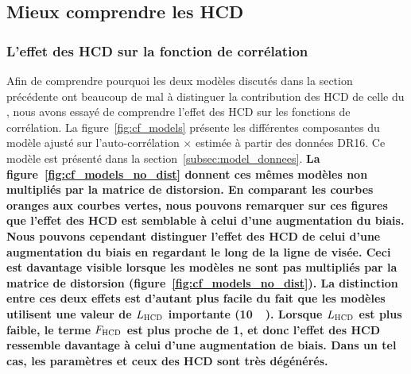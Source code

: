 \subsection{Mieux comprendre les HCD}
\label{subsec:comprendre_hcd}

\subsubsection{L'effet des HCD sur la fonction de corrélation}
Afin de comprendre pourquoi les deux modèles discutés dans la section précédente ont beaucoup de mal à distinguer la contribution des HCD de celle du \lya{}, nous avons essayé de comprendre l'effet des HCD sur les fonctions de corrélation.
La figure~\ref{fig:cf_models} présente les différentes composantes du modèle ajusté sur l'auto-corrélation \lya{}$\times$\lya{} estimée à partir des données DR16. Ce modèle est présenté dans la section~\ref{subsec:model_donnees}.
\textbf{La figure~\ref{fig:cf_models_no_dist} donnent ces mêmes modèles non multipliés par la matrice de distorsion.
  En comparant les courbes oranges aux courbes vertes, nous pouvons remarquer sur ces figures que l'effet des HCD est semblable à celui d'une augmentation du biais.
  Nous pouvons cependant distinguer l'effet des HCD de celui d'une augmentation du biais en regardant le long de la ligne de visée. Ceci est davantage visible lorsque les modèles ne sont pas multipliés par la matrice de distorsion (figure~\ref{fig:cf_models_no_dist}).
  La distinction entre ces deux effets est d'autant plus facile du fait que les modèles utilisent une valeur de $L_{\textsc{HCD}}$ importante (\SI{10}{\perh\Mpc}). Lorsque $L_{\textsc{HCD}}$ est plus faible, le terme $F_{\textsc{HCD}}$ est plus proche de 1, et donc l'effet des HCD ressemble davantage à celui d'une augmentation de biais. Dans un tel cas, les paramètres \lya{} et ceux des HCD sont très dégénérés.
}

